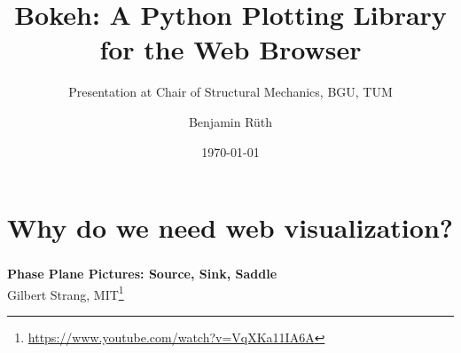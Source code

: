 \documentclass[11pt]{beamer}
\author{Benjamin Rüth}
\title{Bokeh: A Python Plotting Library for the Web Browser}
\subtitle{Presentation at Chair of Structural Mechanics, BGU, TUM}
\date{\today}
\begin{document}

\begin{frame}
\titlepage
\end{frame}

\section{Why do we need web visualization?}
\begin{frame}
\frametitle{\insertsection}
\textbf{Phase Plane Pictures: Source, Sink, Saddle}\\
Gilbert Strang, MIT\footnote{\url{https://www.youtube.com/watch?v=VqXKa11IA6A}}
\begin{center}
\end{center}
\end{frame}
\end{document}
